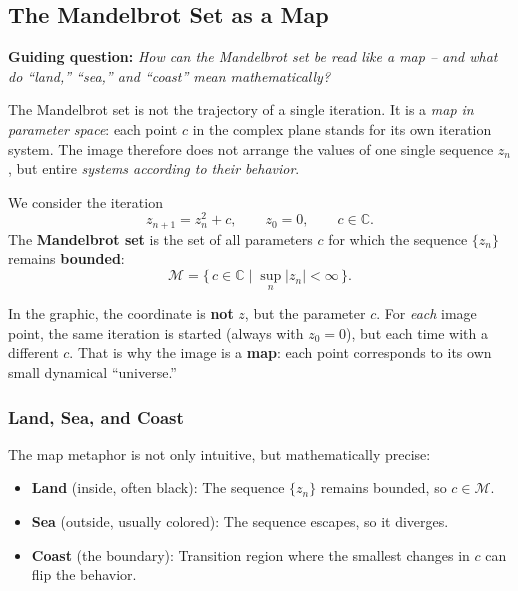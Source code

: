 
\subsection{The Mandelbrot Set as a Map}
\label{sec:VII-7-3}

\textbf{Guiding question:} \emph{How can the Mandelbrot set be read like a map -- and what do ``land,'' ``sea,'' and ``coast'' mean mathematically?}

The Mandelbrot set is not the trajectory of a single iteration.
It is a \emph{map in parameter space}:
each point \(c\) in the complex plane stands for its own iteration system.
The image therefore does not arrange the values of one single sequence \(z_n\),
but entire \emph{systems according to their behavior}.

\begin{MathBox}
	\label{box:map}
	We consider the iteration
	\[
	z_{n+1}=z_n^2+c,\qquad z_0=0,\qquad c\in\mathbb{C}.
	\]
	The \textbf{Mandelbrot set} is the set of all parameters \(c\)
	for which the sequence \(\{z_n\}\) remains \textbf{bounded}:
	\[
	\mathcal{M}=\{\,c\in\mathbb{C}\mid \sup_n |z_n|<\infty\,\}.
	\]
\end{MathBox}

\begin{DidacticBox}
	\label{box:misconception}
	In the graphic, the coordinate is \textbf{not} \(z\),
	but the parameter \(c\).
	For \emph{each} image point, the same iteration is started
	(always with \(z_0=0\)),
	but each time with a different \(c\).
	That is why the image is a \textbf{map}:
	each point corresponds to its own small dynamical ``universe.''
\end{DidacticBox}

\subsubsection*{Land, Sea, and Coast}

The map metaphor is not only intuitive,
but mathematically precise:

\begin{itemize}
	\item \textbf{Land} (inside, often black): The sequence \(\{z_n\}\) remains bounded, so \(c\in\mathcal{M}\).
	\item \textbf{Sea} (outside, usually colored): The sequence escapes, so it diverges.
	\item \textbf{Coast} (the boundary): Transition region where the smallest changes in \(c\) can flip the behavior.
\end{itemize}

